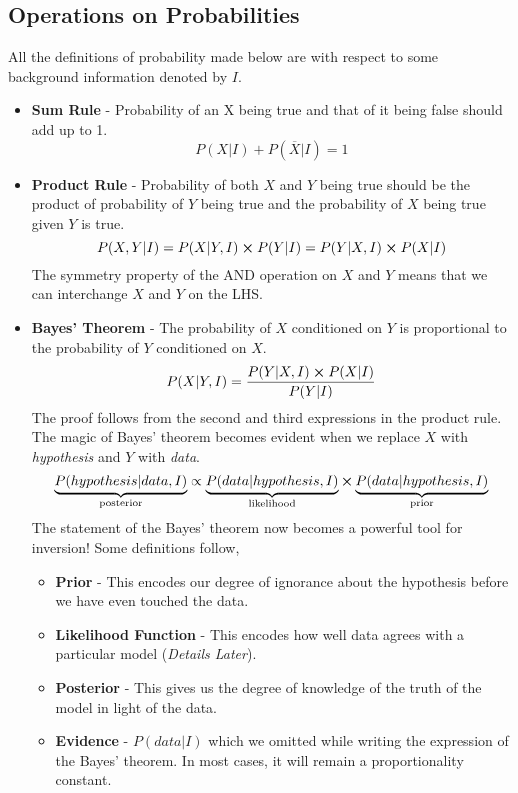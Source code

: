 \documentclass[a4paper,11pt]{article}
\begin{document}
\subsection{Operations on Probabilities}
All the definitions of probability made below are with respect to some background information denoted by $ I $.
\begin{itemize}
	\item \textbf{Sum Rule} - Probability of an X being true and that of it being false should add up to 1.
	\begin{equation*}
	P(X | I) + P (\overline{X} | I) = 1
	\end{equation*}
	\item \textbf{Product Rule} - Probability of both $ X $ and $ Y $ being true should be the product of probability of $ Y $ being true and the probability of $ X $ being true given $ Y $ is true.
	\begin{equation*}
	P(X,Y| I) = P(X|Y,I) \cross P(Y|I) = P(Y|X,I) \cross P(X|I)
	\end{equation*}
	The symmetry property of the AND operation on $ X $ and $ Y $ means that we can interchange $ X $ and $ Y $ on the LHS.
	\item \textbf{Bayes' Theorem} - The probability of $ X $ conditioned on $ Y $ is proportional to the probability of $ Y $ conditioned on $ X $.
	\begin{equation*}
	P(X|Y,I)  =\dfrac{ P(Y|X,I) \cross P(X|I)}{P(Y|I)}
	\end{equation*}
	The proof follows from the second and third expressions in the product rule. The magic of Bayes' theorem becomes evident when we replace $ X $ with \textit{hypothesis} and $ Y $ with \textit{data}.
	\begin{equation*}
	\underbrace{P(hypothesis|data,I)}_{\text{posterior}} \propto \underbrace{ P(data|hypothesis,I)}_{\text{likelihood}} \cross \underbrace{ P(data|hypothesis,I)}_{\text{prior}}
	\end{equation*}
	The statement of the Bayes' theorem now becomes a powerful tool for inversion! Some definitions follow,
	\begin{itemize}
		\item \textbf{Prior} - This encodes our degree of ignorance about the hypothesis before we have even touched the data.
		\item \textbf{Likelihood Function} - This encodes how well data agrees with a particular model (\textit{Details Later}).
		\item \textbf{Posterior} - This gives us the degree of knowledge of the truth of the model in light of the data.
		\item  \textbf{Evidence} - $ P(data| I) $ which we omitted while writing the expression of the Bayes' theorem. In most cases, it will remain a proportionality constant.
	\end{itemize}


\end{itemize}
\end{document}
